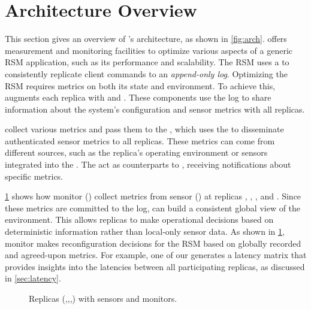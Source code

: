 \section{\sysname Architecture Overview}
\label{sec:optiblogarch}

This section gives an overview of \sysname's architecture, as shown in \cref{fig:arch}.
\sysname offers measurement and monitoring facilities to optimize various aspects of a generic RSM application, such as its performance and scalability.
The RSM uses a \textit{\consmod} to consistently replicate client commands to an \textit{append-only log}.
Optimizing the RSM requires metrics on both its state and environment.
To achieve this, \sysname augments each replica with \textit{\sensors} and \textit{\monitors}.
These components use the log to share information about the system's configuration and sensor metrics with all replicas.

\Sensors collect various metrics and pass them to the \textit{\sensapp}, which uses the \consmod to disseminate authenticated sensor metrics to all replicas.
These metrics can come from different sources, such as the replica's operating environment or sensors integrated into the \consmod.
The \monitors act as counterparts to \sensors, receiving notifications about specific metrics.

\cref{fig:sensors-and-monitors} shows how monitor  () collect metrics from sensor  () at replicas \na, \nb, \nc, and \nd.
Since these metrics are committed to the log, \monitors can build a consistent global view of the environment.
This allows \sysname replicas to make operational decisions based on deterministic information rather than local-only sensor data.
As shown in \cref{fig:sensors-and-monitors}, monitor  makes reconfiguration decisions for the RSM based on globally recorded and agreed-upon metrics.
For example, one of our \monitors generates a latency matrix that provides insights into the latencies between all participating replicas, as discussed in \cref{sec:latency}.

\begin{figure}[hbt]
  \centering
  
  \caption{Replicas (\na,\nb,\nc,\nd) with sensors and monitors.}
  \label{fig:sensors-and-monitors}
\end{figure}
